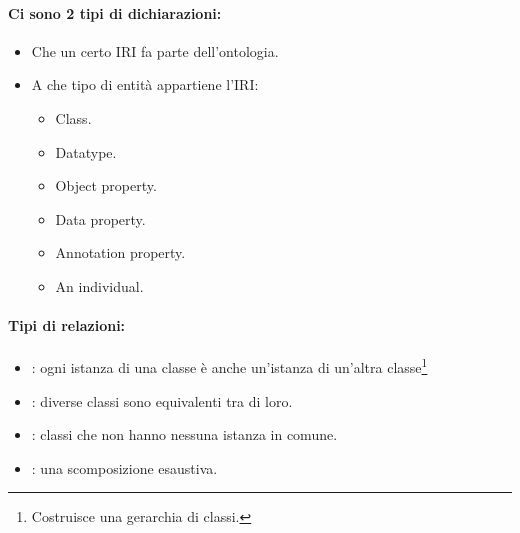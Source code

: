 
\paragraph{Ci sono 2 tipi di dichiarazioni:}

\begin{itemize}
  \item Che un certo IRI fa parte dell'ontologia. 
  \item A che tipo di entità appartiene l'IRI:
    \begin{itemize}
      \item Class. 
      \item Datatype. 
      \item Object property. 
      \item Data property. 
      \item Annotation property. 
      \item An individual.
    \end{itemize}
\end{itemize}

\paragraph{Tipi di relazioni:}

\begin{itemize}
  \item {}: ogni istanza di una classe è anche un'istanza di un'altra classe\footnote{Costruisce una gerarchia di classi.} 
  \item {}: diverse classi sono equivalenti tra di loro.
  \item {}: classi che non hanno nessuna istanza in comune.
  \item {}: una scomposizione esaustiva.
\end{itemize}

